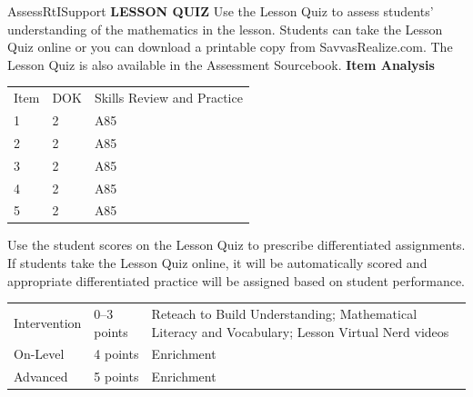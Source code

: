 \documentclass{article}
\newenvironment{te-addendum}[2]{}{}     %
\newcommand{\te}[1]{}                   %
\begin{document}
\te{Printed footer: See answers for Exercises 28--30 on next page. The answers are printed inline on PDF page 44; the next page is the Lesson Quiz.}
\begin{te-addendum}{Assess}{RtISupport}
\textbf{LESSON QUIZ}
Use the Lesson Quiz to assess students' understanding of the mathematics in the lesson.
Students can take the Lesson Quiz online or you can download a printable copy from SavvasRealize.com. The Lesson Quiz is also available in the Assessment Sourcebook.
\textbf{Item Analysis}
\begin{tabular}{lll}
Item & DOK & Skills Review and Practice \\
1 & 2 & A85 \\
2 & 2 & A85 \\
3 & 2 & A85 \\
4 & 2 & A85 \\
5 & 2 & A85 \\
\end{tabular}
Use the student scores on the Lesson Quiz to prescribe differentiated assignments.
If students take the Lesson Quiz online, it will be automatically scored and appropriate differentiated practice will be assigned based on student performance.
\begin{tabular}{lll}
Intervention & 0--3 points & Reteach to Build Understanding; Mathematical Literacy and Vocabulary; Lesson Virtual Nerd videos \\
On-Level & 4 points & Enrichment \\
Advanced & 5 points & Enrichment \\
\end{tabular}
\end{te-addendum}
\end{document}
